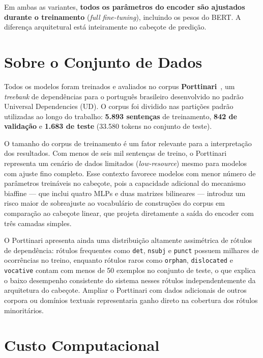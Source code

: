 Em ambas as variantes, \textbf{todos os parâmetros do encoder são ajustados durante o
treinamento} (\textit{full fine-tuning}), incluindo os pesos do BERT. A diferença
arquitetural está inteiramente no cabeçote de predição.

\section{Sobre o Conjunto de Dados}
\label{sec:dataset_conclusao}

Todos os modelos foram treinados e avaliados no corpus \textbf{Porttinari}~\citep{porttinari},
um \textit{treebank} de dependências para o português brasileiro desenvolvido no padrão
Universal Dependencies (UD). O corpus foi dividido nas partições padrão utilizadas ao longo
do trabalho: \textbf{5.893 sentenças} de treinamento, \textbf{842 de validação} e
\textbf{1.683 de teste} (33.580 tokens no conjunto de teste).

O tamanho do corpus de treinamento é um fator relevante para a interpretação dos resultados.
Com menos de seis mil sentenças de treino, o Porttinari representa um cenário de dados
limitados (\textit{low-resource}) mesmo para modelos com ajuste fino completo. Esse contexto
favorece modelos com menor número de parâmetros treináveis no cabeçote, pois a capacidade
adicional do mecanismo biaffine — que inclui quatro MLPs e duas matrizes bilineares —
introduz um risco maior de sobreajuste ao vocabulário de construções do corpus em comparação
ao cabeçote linear, que projeta diretamente a saída do encoder com três camadas simples.

O Porttinari apresenta ainda uma distribuição altamente assimétrica de rótulos de dependência:
rótulos frequentes como \texttt{det}, \texttt{nsubj} e \texttt{punct} possuem milhares de
ocorrências no treino, enquanto rótulos raros como \texttt{orphan}, \texttt{dislocated} e
\texttt{vocative} contam com menos de 50 exemplos no conjunto de teste, o que explica o baixo
desempenho consistente do sistema nesses rótulos independentemente da arquitetura do cabeçote.
Ampliar o Porttinari com dados adicionais de outros corpora ou domínios textuais
representaria ganho direto na cobertura dos rótulos minoritários.

\section{Custo Computacional}
\label{sec:custo_computacional}


